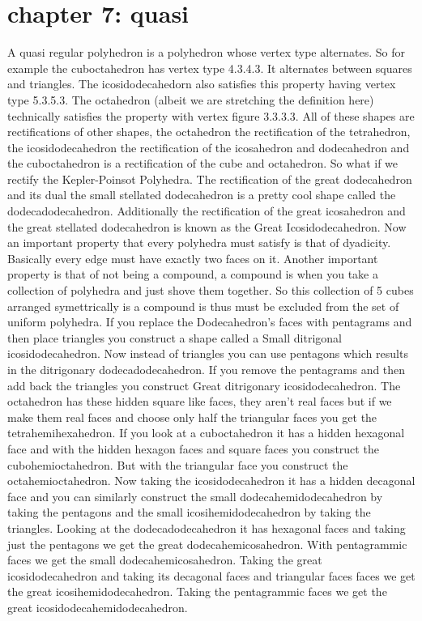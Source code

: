 \documentclass{article}
\begin{document}
\section*{chapter 7: quasi}
A quasi regular polyhedron is a polyhedron whose vertex type alternates. So for example the cuboctahedron has vertex type 4.3.4.3. It alternates between squares and triangles. The icosidodecahedorn also satisfies this property having vertex type 5.3.5.3. The octahedron (albeit we are stretching the definition here) technically satisfies the property with vertex figure 3.3.3.3. All of these shapes are rectifications of other shapes, the octahedron the rectification of the tetrahedron, the icosidodecahedron the rectification of the icosahedron and dodecahedron and the cuboctahedron is a rectification of the cube and octahedron. So what if we rectify the Kepler-Poinsot Polyhedra. The rectification of the great dodecahedron and its dual the small stellated dodecahedron is a pretty cool shape called the dodecadodecahedron. Additionally the rectification of the great icosahedron and the great stellated dodecahedron is known as the Great Icosidodecahedron. Now an important property that every polyhedra must satisfy is that of dyadicity. Basically every edge must have exactly two faces on it. Another important property is that of not being a compound, a compound is when you take a collection of polyhedra and just shove them together. So this collection of 5 cubes arranged symettrically is a compound is thus must be excluded from the set of uniform polyhedra. If you replace the Dodecahedron's faces with pentagrams and then place triangles you construct a shape called a Small ditrigonal icosidodecahedron. Now instead of triangles you can use pentagons which results in the ditrigonary dodecadodecahedron. If you remove the pentagrams and then add back the triangles you construct Great ditrigonary icosidodecahedron. The octahedron has these hidden square like faces, they aren't real faces but if we make them real faces and choose only half the triangular faces you get the tetrahemihexahedron. If you look at a cuboctahedron it has a hidden hexagonal face and with the hidden hexagon faces and square faces you construct the cubohemioctahedron. But with the triangular face you construct the octahemioctahedron. Now taking the icosidodecahedron it has a hidden decagonal face and you can similarly construct the small dodecahemidodecahedron by taking the pentagons and the small icosihemidodecahedron by taking the triangles. Looking at the dodecadodecahedron it has hexagonal faces and taking just the pentagons we get the great dodecahemicosahedron. With pentagrammic faces we get the small dodecahemicosahedron. Taking the great icosidodecahedron and taking its decagonal faces and triangular faces faces we get the great icosihemidodecahedron. Taking the pentagrammic faces we get the great icosidodecahemidodecahedron.
\end{document}
